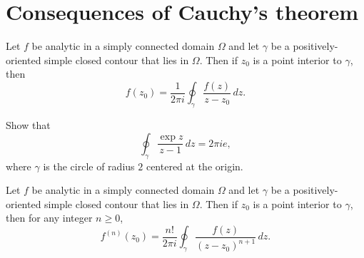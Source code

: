 \section{Consequences of Cauchy's theorem}

\begin{theorem}
    Let \(f\) be analytic in a simply connected domain \(\Omega\) and let
    \(\gamma\) be a positively-oriented simple closed contour that lies in
    \(\Omega\). Then if \(z_0\) is a point interior to \(\gamma\), then
    \[
        f(z_0) = \frac{1}{2\pi i} \oint_\gamma \frac{f(z)}{z - z_0} \, dz.
    \]
    \label{thm:cauchys-integral-formula}
\end{theorem}

\begin{example}
    Show that
    \[
        \oint_{\gamma} \frac{\exp z}{z - 1} \, dz = 2\pi i e,
    \]
    where \(\gamma\) is the circle of radius \(2\) centered at the origin.
\end{example}

\begin{theorem}
    Let \(f\) be analytic in a simply connected domain \(\Omega\) and let
    \(\gamma\) be a positively-oriented simple closed contour that lies in
    \(\Omega\). Then if \(z_0\) is a point interior to \(\gamma\), then for any
    integer \(n \geq 0\),
    \[
        f^{(n)}(z_0) = \frac{n!}{2\pi i} \oint_\gamma \frac{f(z)}{(z - z_0)^{n+1}} \, dz.
    \]
    \label{thm:cauchys-integral-formula-nth-derivative}
\end{theorem}